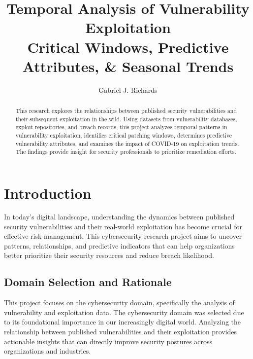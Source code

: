 \documentclass[runningheads]{llncs}
\begin{document}
%
\title{Temporal Analysis of Vulnerability Exploitation\\[0.5cm]
\normalsize Critical Windows, Predictive Attributes, \& Seasonal Trends}
%
%
\author{Gabriel J. Richards}
%
%
%
\maketitle              %
%
\begin{abstract}
This research explores the relationships between published security vulnerabilities and their subsequent exploitation in the wild. Using datasets from vulnerability databases, exploit repositories, and breach records, this project analyzes temporal patterns in vulnerability exploitation, identifies critical patching windows, determines predictive vulnerability attributes, and examines the impact of COVID-19 on exploitation trends. The findings provide insight for security professionals to prioritize remediation efforts.

\end{abstract}
%
%
%
\section{Introduction}

In today's digital landscape, understanding the dynamics between published security vulnerabilities and their real-world exploitation has become crucial for effective risk management. This cybersecurity research project aims to uncover patterns, relationships, and predictive indicators that can help organizations better prioritize their security resources and reduce breach likelihood.

\subsection{Domain Selection and Rationale}
This project focuses on the cybersecurity domain, specifically the analysis of vulnerability and exploitation data. The cybersecurity domain was selected due to its foundational importance in our increasingly digital world. Analyzing the relationship between published vulnerabilities and their exploitation provides actionable insights that can directly improve security postures across organizations and industries.
\end{document}
